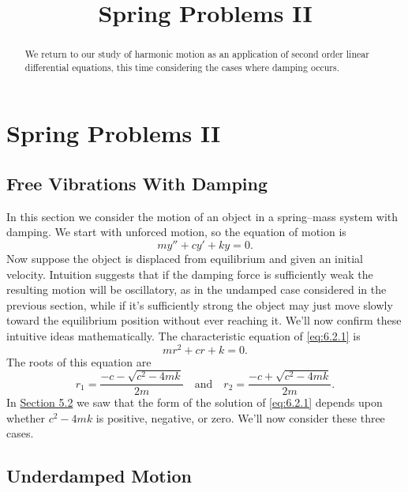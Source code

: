 \documentclass{ximera}
\title{Spring Problems II}
\begin{document}
 
\begin{abstract}
 We return to our study of harmonic motion as an application of second order linear differential equations, this time considering the cases where damping occurs.
\end{abstract}
 
\maketitle
 
\section*{Spring Problems II}
 
\subsection*{Free Vibrations With Damping}
 
In this section we consider the motion of an object in a spring--mass
system with damping. We start with unforced motion, so the equation of
motion is
\begin{equation}\label{eq:6.2.1}
my''+cy'+ky=0.
\end{equation}
Now suppose   the object is displaced from equilibrium and given an
initial velocity. Intuition suggests that if the damping force is
sufficiently weak the resulting motion will be oscillatory, as in the
undamped case considered in the previous section, while if it's
sufficiently strong the object may just move slowly toward the
equilibrium
position without ever reaching it. We'll now confirm these intuitive
ideas mathematically. The characteristic equation of \eqref{eq:6.2.1} is
$$
mr^2+cr+k=0.
$$
The roots of this equation are
\begin{equation}\label{eq:6.2.2}
r_1=\frac{-c-\sqrt{c^2-4mk}}{2m}\quad\mbox{and}\quad r_2=
\frac{-c+\sqrt{c^2-4mk}}{2m}.
\end{equation}
In \href{https://xerxes.ximera.org/differentialequations/main/constantCoefficientHomogeneousEquations/constantCoefficientHomogeneousEquations}{Section 5.2} we saw that the form of the
solution of  \eqref{eq:6.2.1} depends upon whether $c^2-4mk$ is positive,
negative, or zero. We'll now consider these three cases.
 
\subsection*{Underdamped Motion}
 
\end{document}
